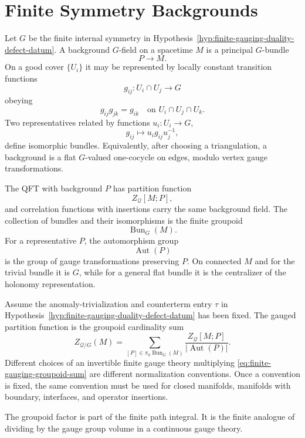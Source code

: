 \section{Finite Symmetry Backgrounds}

Let \(G\) be the finite internal symmetry in
Hypothesis~\ref{hyp:finite-gauging-duality-defect-datum}.  A background
\(G\)-field on a spacetime \(M\) is a principal
\(G\)-bundle
\[
  P\to M.
\]
On a good cover \(\{U_i\}\) it may be represented by locally constant
transition functions
\[
  g_{ij}:U_i\cap U_j\longrightarrow G
\]
obeying
\[
  g_{ij}g_{jk}=g_{ik}
  \quad\text{on }U_i\cap U_j\cap U_k.
\]
Two representatives related by functions \(u_i:U_i\to G\),
\[
  g_{ij}\mapsto u_i g_{ij}u_j^{-1},
\]
define isomorphic bundles.  Equivalently, after choosing a triangulation, a
background is a flat \(G\)-valued one-cocycle on edges, modulo vertex gauge
transformations.

The QFT with background \(P\) has partition function
\[
  Z_{\mathcal Q}[M;P],
\]
and correlation functions with insertions carry the same background field.
The collection of bundles and their isomorphisms is the finite groupoid
\[
  \operatorname{Bun}_G(M).
\]
For a representative \(P\), the automorphism group
\[
  \operatorname{Aut}(P)
\]
is the group of gauge transformations preserving \(P\).  On connected \(M\)
and for the trivial bundle it is \(G\), while for a general flat bundle it is
the centralizer of the holonomy representation.

\begin{definition}
\label{def:finite-gauging-groupoid-sum}
Assume the anomaly-trivialization and counterterm entry \(\tau\) in
Hypothesis~\ref{hyp:finite-gauging-duality-defect-datum} has been fixed.  The
gauged partition function is the groupoid cardinality sum
\begin{equation}
  Z_{\mathcal Q/G}(M)
  =
  \sum_{[P]\in\pi_0\operatorname{Bun}_G(M)}
  \frac{Z_{\mathcal Q}[M;P]}{|\operatorname{Aut}(P)|}.
  \label{eq:finite-gauging-groupoid-sum}
\end{equation}
Different choices of an invertible finite gauge theory multiplying
\eqref{eq:finite-gauging-groupoid-sum} are different normalization
conventions.  Once a convention is fixed, the same convention must be used for
closed manifolds, manifolds with boundary, interfaces, and operator
insertions.
\end{definition}

The groupoid factor is part of the finite path integral.  It is the finite
analogue of dividing by the gauge group volume in a continuous gauge theory.


